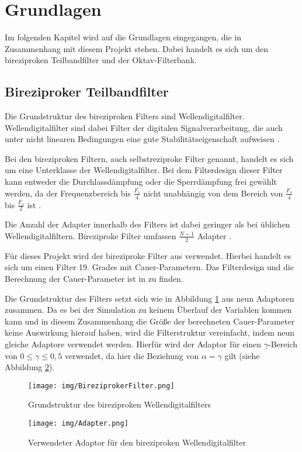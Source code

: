 %

\section{Grundlagen}
Im folgenden Kapitel wird auf die Grundlagen eingegangen, die in Zusammenhang mit diesem Projekt stehen. Dabei handelt es sich um den bireziproken Teilbandfilter und der Oktav-Filterbank.

\subsection{Bireziproker Teilbandfilter}
Die Grundstruktur des bireziproken Filters sind Wellendigitalfilter. Wellendigitalfilter sind dabei Filter der digitalen Signalverarbeitung, die auch unter nicht linearen Bedingungen eine gute Stabilitätseigenschaft aufweisen \cite[vgl.][S. 68]{gaszi1983}.\par
Bei den bireziproken Filtern, auch selbstreziproke Filter genannt, handelt es sich um eine Unterklasse der Wellendigitalfilter. Bei dem Filterdesign dieser Filter kann entweder die Durchlassdämpfung oder die Sperrdämpfung frei gewählt werden, da der Frequenzbereich bis $\frac{F_s}{4}$ nicht unabhängig von dem Bereich von $\frac{F_s}{4}$ bis $\frac{F_s}{2}$ ist \cite[vgl.][S. 72]{gaszi1983}.\par
Die Anzahl der Adapter innerhalb des Filters ist dabei geringer als bei üblichen Wellendigitalfiltern. Bireziproke Filter umfassen $\frac{N - 1}{2}$ Adapter \cite[vgl.][S. 73]{gaszi1983}.\par
Für dieses Projekt wird der bireziproke Filter aus \cite{gaszi1983} verwendet. Hierbei handelt es sich um einen Filter 19. Grades mit Cauer-Parametern. Das Filterdesign und die Berechnung der Cauer-Parameter ist in \cite[][S. 74]{gaszi1983} zu finden.\par
Die Grundstruktur des Filters setzt sich wie in Abbildung \ref{fig:bireziprok_Struktur} aus neun Adaptoren zusammen. Da es bei der Simulation zu keinem Überlauf der Variablen kommen kann und in diesem Zusammenhang die Größe der berechneten Cauer-Parameter keine Auswirkung hierauf haben, wird die Filterstruktur vereinfacht, indem neun gleiche Adaptore verwendet werden. Hierfür wird der Adaptor für einen $\gamma$-Bereich von $0\leq\gamma\leq0,5$ verwendet, da hier die Beziehung von $\alpha=\gamma$ gilt (siehe Abbildung \ref{fig:Adaptor}).
\begin{figure}[h!]
	\centering	\texttt{[image: img/BireziprokerFilter.png]}
	\caption{Grundstruktur des bireziproken Wellendigitalfilters \cite[][S. 85]{gaszi1983}}
	\label{fig:bireziprok_Struktur}
\end{figure}
\begin{figure}[h!]
	\centering	\texttt{[image: img/Adapter.png]}
	\caption{Verwendeter Adaptor für den bireziproken Wellendigitalfilter \cite[][S. 77]{gaszi1983}}
	\label{fig:Adaptor}
\end{figure}

